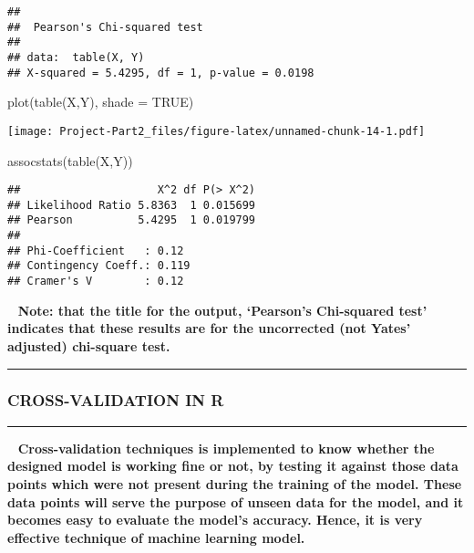 \documentclass[
]{article}
\newenvironment{Shaded}{\begin{snugshade}}{\end{snugshade}}
\newcommand{\AttributeTok}[1]{\textcolor[rgb]{0.77,0.63,0.00}{#1}}
\newcommand{\ConstantTok}[1]{\textcolor[rgb]{0.00,0.00,0.00}{#1}}
\newcommand{\FunctionTok}[1]{\textcolor[rgb]{0.00,0.00,0.00}{#1}}
\newcommand{\NormalTok}[1]{#1}
\begin{document}
\begin{verbatim}
## 
##  Pearson's Chi-squared test
## 
## data:  table(X, Y)
## X-squared = 5.4295, df = 1, p-value = 0.0198
\end{verbatim}

\begin{Shaded}
\begin{Highlighting}[]
\FunctionTok{plot}\NormalTok{(}\FunctionTok{table}\NormalTok{(X,Y), }\AttributeTok{shade =} \ConstantTok{TRUE}\NormalTok{)}
\end{Highlighting}
\end{Shaded}

\texttt{[image: Project-Part2\_files/figure-latex/unnamed-chunk-14-1.pdf]}

\begin{Shaded}
\begin{Highlighting}[]
\FunctionTok{assocstats}\NormalTok{(}\FunctionTok{table}\NormalTok{(X,Y))}
\end{Highlighting}
\end{Shaded}

\begin{verbatim}
##                     X^2 df P(> X^2)
## Likelihood Ratio 5.8363  1 0.015699
## Pearson          5.4295  1 0.019799
## 
## Phi-Coefficient   : 0.12 
## Contingency Coeff.: 0.119 
## Cramer's V        : 0.12
\end{verbatim}

~ \textbf{Note: that the title for the output, `Pearson's Chi-squared
test' indicates that these results are for the uncorrected (not Yates'
adjusted) chi-square test.}

\begin{center}\rule{0.5\linewidth}{0.5pt}\end{center}

\hypertarget{cross-validation-in-r}{%
\subsubsection{\texorpdfstring{\textbf{CROSS-VALIDATION IN
R}}{CROSS-VALIDATION IN R}}\label{cross-validation-in-r}}

\begin{center}\rule{0.5\linewidth}{0.5pt}\end{center}

~ \textbf{Cross-validation techniques is implemented to know whether the
designed model is working fine or not, by testing it against those data
points which were not present during the training of the model. These
data points will serve the purpose of unseen data for the model, and it
becomes easy to evaluate the model's accuracy. Hence, it is very
effective technique of machine learning model.}
\end{document}
